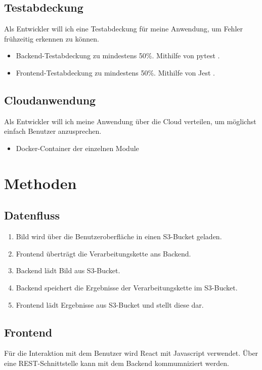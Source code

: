 \documentclass[conference]{IEEEtran}
\begin{document}
\subsection{Testabdeckung}
Als Entwickler will ich eine Testabdeckung für meine Anwendung, um Fehler frühzeitig erkennen zu können.
\begin{itemize}
	\item Backend-Testabdeckung zu mindestens 50\%. Mithilfe von pytest \cite{pytest}.
	\item Frontend-Testabdeckung zu mindestens 50\%. Mithilfe von Jest \cite{jest}.
\end{itemize}

\subsection{Cloudanwendung}
Als Entwickler will ich meine Anwendung über die Cloud verteilen, um möglichst einfach Benutzer anzusprechen.
\begin{itemize}
	\item Docker-Container der einzelnen Module
\end{itemize}

\section{Methoden}

\subsection{Datenfluss}
\begin{enumerate}
	\item Bild wird über die Benutzeroberfläche in einen S3-Bucket geladen.
	\item Frontend überträgt die Verarbeitungskette ans Backend.
	\item Backend lädt Bild aus S3-Bucket.
	\item Backend speichert die Ergebnisse der Verarbeitungskette im S3-Bucket.
	\item Frontend lädt Ergebnisse aus S3-Bucket und stellt diese dar.
\end{enumerate}

\subsection{Frontend}
Für die Interaktion mit dem Benutzer wird React \cite{react} mit Javascript verwendet. Über eine REST-Schnittstelle kann mit dem Backend kommumniziert werden.
\end{document}
